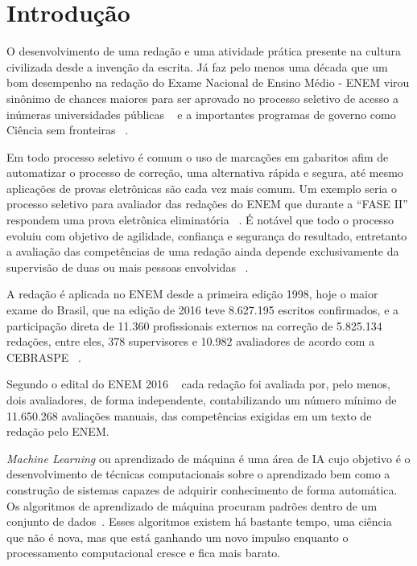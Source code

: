 \chapter{Introdução}\label{CAP:introducao}

\noindent O desenvolvimento de uma redação e uma atividade prática presente na cultura civilizada desde a invenção da escrita.
Já faz pelo menos uma década que um bom desempenho na redação do Exame Nacional de Ensino Médio - ENEM  virou sinônimo de chances maiores para ser aprovado no processo seletivo de acesso a inúmeras universidades públicas ~\cite{sisu:2017} e a importantes programas de governo como Ciência sem fronteiras ~\cite{csf:2017}.

Em todo processo seletivo é comum o uso de marcações em gabaritos afim de automatizar o processo de correção, uma alternativa rápida e segura, até mesmo aplicações de provas eletrônicas são cada vez mais comum. Um exemplo seria o processo seletivo para avaliador das redações do ENEM que durante a ``FASE II'' respondem uma prova eletrônica eliminatória ~\cite{paq_a:2016}. É notável que todo o processo evoluiu com objetivo de agilidade, confiança e segurança do resultado, entretanto a avaliação das competências de uma redação ainda depende exclusivamente da supervisão de duas ou mais pessoas envolvidas ~\cite{edital_enem:2016}.

A redação é aplicada no ENEM desde a primeira edição 1998, hoje o maior exame do Brasil, que na edição de 2016 teve 8.627.195 escritos confirmados, e a participação direta de 11.360 profissionais externos na correção de 5.825.134 redações, entre eles, 378 supervisores e 10.982 avaliadores de acordo com a CEBRASPE ~\cite{relatorio_de_gestao:2016}. 

Segundo o edital do ENEM 2016 ~\cite{edital_enem:2016} cada redação foi avaliada por, pelo menos, dois avaliadores, de forma independente, contabilizando um número mínimo de 11.650.268 avaliações manuais, das competências exigidas em um texto de redação pelo ENEM.

\textit{Machine Learning} ou aprendizado de máquina é uma área de IA cujo objetivo é o desenvolvimento de técnicas computacionais sobre o aprendizado bem como a construção de sistemas capazes de adquirir conhecimento de forma automática. Os algoritmos de aprendizado de máquina procuram padrões dentro de um conjunto de dados~\cite{machine_learning:1997}. Esses algoritmos existem há bastante tempo, uma ciência que não é nova, mas que está ganhando um novo impulso enquanto o processamento computacional cresce e fica mais barato.

